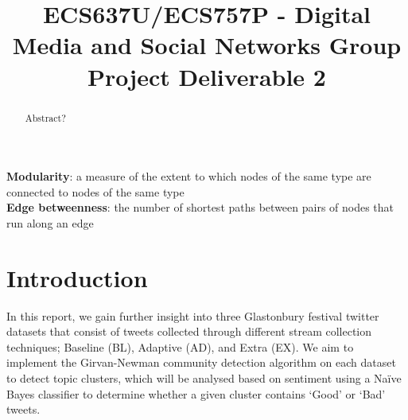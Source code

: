 \documentclass[conference]{IEEEtran}
\begin{document}
\pagecolor{white!30}

\title{ECS637U/ECS757P - Digital Media and Social Networks Group Project Deliverable 2}

\author{

\and


\and


\and

}

\maketitle
\thispagestyle{plain}
\pagestyle{plain}

\begin{abstract}
Abstract?
\end{abstract}

\begin{IEEEkeywords}
\textbf{Modularity}: a measure of the extent to which nodes of the same type are connected to nodes of the same type \\
\textbf{Edge betweenness}: the number of shortest paths between pairs of nodes that run along an edge \cite{b1}
\end{IEEEkeywords}

\section{Introduction}
	{
		In this report, we gain further insight into three Glastonbury festival twitter datasets that consist of tweets collected through different stream collection techniques; Baseline (BL), Adaptive (AD), and Extra (EX). We aim to implement the Girvan-Newman community detection algorithm on each dataset to detect topic clusters, which will be analysed based on sentiment using a Naïve Bayes classifier to determine whether a given cluster contains ‘Good’ or ‘Bad’ tweets.
	\par}
\end{document}
